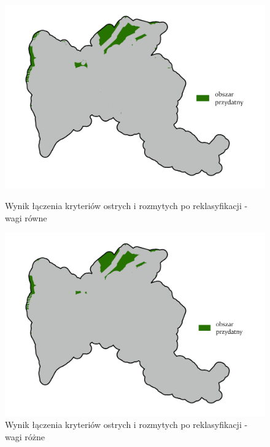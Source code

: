 \documentclass{article}
\begin{document}
\begin{figure}[H]
    \begin{minipage}[t]{0.48\textwidth}
        \centering
        \includegraphics[width=\linewidth]{img/wynik-po-reklasyfikacji.jpg}
        \caption{Wynik łączenia kryteriów ostrych i rozmytych po reklasyfikacji - wagi równe}
        \label{fig:wynik-reklasyfikacja-rowne}
    \end{minipage}
    \hfill
    \begin{minipage}[t]{0.48\textwidth}
        \centering
        \includegraphics[width=\linewidth]{img/roznewagi-wynik-po-reklasyfikacji.jpg}
        \caption{Wynik łączenia kryteriów ostrych i rozmytych po reklasyfikacji - wagi różne}
        \label{fig:wynik-reklasyfikacja-rozne}
    \end{minipage}
\end{figure}
\end{document}
